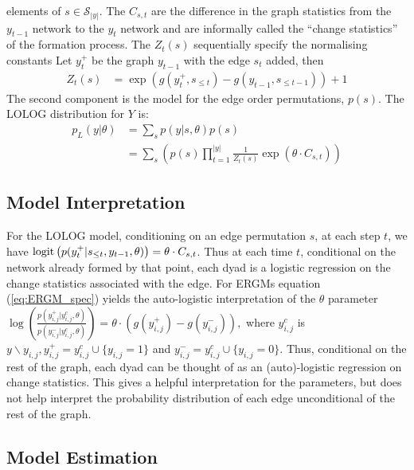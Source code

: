 \documentclass[
]{statsoc}
\begin{document}
elements of \(s \in \mathscr{S}_{|y|}\). The \(C_{s,t}\) are the
difference in the graph statistics from the \(y_{t-1}\) network to the
\(y_{t}\) network and are informally called the ``change statistics'' of
the formation process. The \(Z_{t}(s)\) sequentially specify the
normalising constants Let \(y_{t}^{+}\) be the graph \(y_{t-1}\) with
the edge \(s_{t}\) added, then \begin{align}
Z_{t}(s) &= \exp\left(g(y_{t}^{+},s_{\leq t}) - g(y_{t-1},s_{\leq t-1})\right) + 1
\end{align} The second component is the model for the edge order
permutations, \(p(s)\). The LOLOG distribution for \(Y\) is:
\begin{align}
p_{L}(y \vert \theta) &= \sum_{s} p(y \vert s, \theta)p(s) \nonumber \\
&= \sum_{s} \left( p(s)\prod_{t=1}^{|y|} \frac{1}{Z_t(s)} \exp\left(\theta\cdot C_{s,t}\right)\right) \label{eq:lolog}
\end{align}

\subsection{Model Interpretation}

For the LOLOG model, conditioning on an edge permutation \(s\), at each
step \(t\), we have
\({\rm logit}\left( {p(y_{t}^{+} \vert s_{\leq t}, y_{t-1}, \theta )}\right) = \theta\cdot C_{s,t}\).
Thus at each time \(t\), conditional on the network already formed by
that point, each dyad is a logistic regression on the change statistics
associated with the edge. For ERGMs equation (\ref{eq:ERGM_spec}) yields
the auto-logistic interpretation of the \(\theta\) parameter
\(\log\left(\frac{p(y_{i,j}^{+} \vert y_{i,j}^{c}, \theta )}{p(y_{i,j}^{-} \vert y_{i,j}^{c}, \theta )}\right) = \theta\cdot (g(y_{i,j}^{+}) - g(y_{i,j}^{-})),\)
where \(y_{i,j}^{c}\) is
\(y{\backslash}y_{i,j}, y_{i,j}^{+}=y_{i,j}^{c}\cup\{y_{i,j}=1\}\) and
\(y_{i,j}^{-} = y_{i,j}^{c}\cup\{y_{i,j}=0\}\). Thus, conditional on the
rest of the graph, each dyad can be thought of as an (auto)-logistic
regression on change statistics. This gives a helpful interpretation for
the parameters, but does not help interpret the probability distribution
of each edge unconditional of the rest of the graph.

\subsection{Model Estimation}
\end{document}
